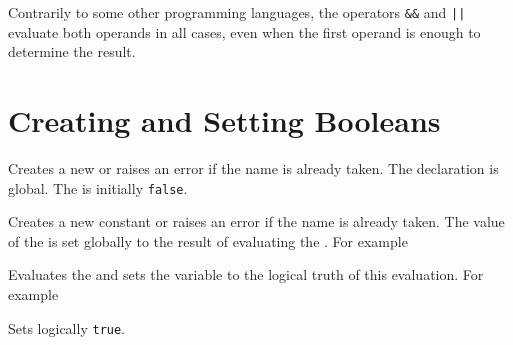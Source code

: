 \documentclass[oneside]{book}
\begin{document}
Contrarily to some other programming languages, the operators \verb|&&| and
\verb"||" evaluate both operands in all cases, even when the first
operand is enough to determine the result.

\section{Creating and Setting Booleans}

\begin{function}{\boolNew}
\begin{syntax}
 
\end{syntax}
Creates a new  or raises an error if the
name is already taken. The declaration is global. The
 is initially \texttt{false}.
\end{function}

\begin{function}{\boolConst}
\begin{syntax}
  
\end{syntax}
Creates a new constant  or raises an error if the name
is already taken. The value of the  is set globally to
the result of evaluating the .
For example
\begin{codehigh}
\boolConst {}
\boolVarLog \cFooSomeBool
\end{codehigh}
\end{function}

\begin{function}{\boolSet}
\begin{syntax}
  
\end{syntax}
Evaluates the  and sets the  variable to
the logical truth of this evaluation.
For example
\begin{codehigh}
\boolSet {}
\boolVarLog \lTmpaBool
\end{codehigh}
\begin{codehigh}
\boolSet {}
\boolVarLog \lTmpaBool
\end{codehigh}
\end{function}

\begin{function}{\boolSetTrue}
\begin{syntax}
 
\end{syntax}
Sets  logically \texttt{true}.
\end{function}
\end{document}
